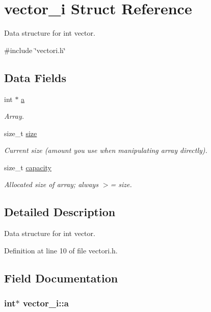 \hypertarget{structvector__i}{\section{vector\-\_\-i \-Struct \-Reference}
\label{structvector__i}
}


\-Data structure for int vector.  




{\ttfamily \#include \char`\"{}vectori.\-h\char`\"{}}

\subsection*{\-Data \-Fields}
\begin{DoxyCompactItemize}
\item 
int $\ast$ \hyperlink{structvector__i_a1f7c0e586cb1e09323dec3dd48d13882}{a}
\begin{DoxyCompactList}\small\item\em \-Array. \end{DoxyCompactList}\item 
size\-\_\-t \hyperlink{structvector__i_a8df52068982f4b7dcaa024b37f243282}{size}
\begin{DoxyCompactList}\small\item\em \-Current size (amount you use when manipulating array directly). \end{DoxyCompactList}\item 
size\-\_\-t \hyperlink{structvector__i_a8e7421832635519ee2ccebd19298b705}{capacity}
\begin{DoxyCompactList}\small\item\em \-Allocated size of array; always $>$= size. \end{DoxyCompactList}\end{DoxyCompactItemize}


\subsection{\-Detailed \-Description}
\-Data structure for int vector. 



\-Definition at line 10 of file vectori.\-h.



\subsection{\-Field \-Documentation}
\hypertarget{structvector__i_a1f7c0e586cb1e09323dec3dd48d13882}{
\subsubsection[{a}]{\setlength{\rightskip}{0pt plus 5cm}int$\ast$ {\bf vector\-\_\-i\-::a}}}\label{structvector__i_a1f7c0e586cb1e09323dec3dd48d13882}


